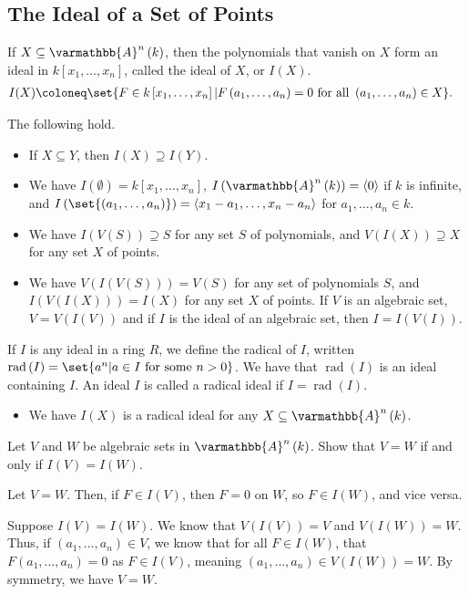 \documentclass[10pt]{mypackage}
\renewcommand*{\mathbb}[1]{\varmathbb{#1}}
\newcommand{\A}{\mathbb{A}}
\begin{document}
\subsection{The Ideal of a Set of Points}%
\begin{definition}
  If $X\subseteq \A^n\left(k\right)$, then the polynomials that vanish on $X$ form an ideal in $k\left[x_1,\dots,x_n\right]$, called the ideal of $X$, or $I(X)$.
  \begin{align*}
    I(X) &\coloneq \set{F\in k\left[x_1,\dots,x_n\right] | F\left(a_1,\dots,a_n\right) = 0\text{ for all }\left(a_1,\dots,a_n\right)\in X}.
  \end{align*}
\end{definition}
The following hold.
\begin{itemize}
  \item If $X\subseteq Y$, then $I(X)\supseteq I(Y)$.
  \item We have $I\left(\emptyset\right) = k\left[x_1,\dots,x_n\right]$, $I\left(\A^n\left(k\right)\right) = \left\langle 0 \right\rangle$ if $k$ is infinite, and $I\left(\set{\left(a_1,\dots,a_n\right)}\right) = \left\langle x_1-a_1,\dots,x_n-a_n \right\rangle$ for $a_1,\dots,a_n\in k$.
  \item We have $I\left(V(S)\right) \supseteq S$ for any set $S$ of polynomials, and $V\left(I(X)\right)\supseteq X$ for any set $X$ of points.
  \item We have $V(I(V(S))) = V(S)$ for any set of polynomials $S$, and $I(V(I(X))) = I(X)$ for any set $X$ of points. If $V$ is an algebraic set, $V = V(I(V))$ and if $I$ is the ideal of an algebraic set, then $I = I(V(I))$.
\end{itemize}
\begin{definition}
  If $I$ is any ideal in a ring $R$, we define the radical of $I$, written $\operatorname{rad}\left(I\right) = \set{a^n | a\in I\text{ for some }n > 0}$. We have that $\operatorname{rad}\left(I\right)$ is an ideal containing $I$. An ideal $I$ is called a radical ideal if $I = \operatorname{rad}\left(I\right)$.
\end{definition}
\begin{itemize}
  \item We have $I(X)$ is a radical ideal for any $X\subseteq \A^n\left(k\right)$.
\end{itemize}
\begin{exercise}[Exercise 1.16]
Let $V$ and $W$ be algebraic sets in $\A^n\left(k\right)$. Show that $V = W$ if and only if $I(V) = I(W)$.
\end{exercise}
\begin{solution}
  Let $V = W$. Then, if $F\in I(V)$, then $F = 0$ on $W$, so $F\in I(W)$, and vice versa.\newline

  Suppose $I(V) = I(W)$. We know that $V(I(V)) = V$ and $V(I(W)) = W$. Thus, if $\left(a_1,\dots,a_n\right)\in V$, we know that for all $F\in I(W)$, that $F\left(a_1,\dots,a_n\right) = 0$ as $F\in I(V)$, meaning $\left(a_1,\dots,a_n\right)\in V(I(W)) = W$. By symmetry, we have $V = W$.
\end{solution}
\end{document}
